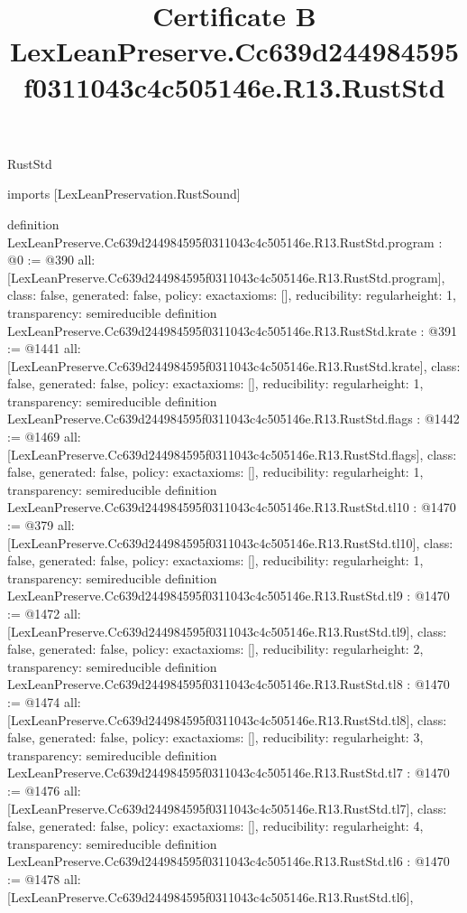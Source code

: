 \begin{lexlean}{RustStd}
\title{Certificate B LexLeanPreserve.Cc639d244984595f0311043c4c505146e.R13.RustStd}
\begin{coremodule}
imports [LexLeanPreservation.RustSound]

definition LexLeanPreserve.Cc639d244984595f0311043c4c505146e.R13.RustStd.program : @0 := @390 {
  all: [LexLeanPreserve.Cc639d244984595f0311043c4c505146e.R13.RustStd.program],
  class: false,
  generated: false,
  policy: exact{axioms: []},
  reducibility: regular{height: 1},
  transparency: semireducible
}
definition LexLeanPreserve.Cc639d244984595f0311043c4c505146e.R13.RustStd.krate : @391 := @1441 {
  all: [LexLeanPreserve.Cc639d244984595f0311043c4c505146e.R13.RustStd.krate],
  class: false,
  generated: false,
  policy: exact{axioms: []},
  reducibility: regular{height: 1},
  transparency: semireducible
}
definition LexLeanPreserve.Cc639d244984595f0311043c4c505146e.R13.RustStd.flags : @1442 := @1469 {
  all: [LexLeanPreserve.Cc639d244984595f0311043c4c505146e.R13.RustStd.flags],
  class: false,
  generated: false,
  policy: exact{axioms: []},
  reducibility: regular{height: 1},
  transparency: semireducible
}
definition LexLeanPreserve.Cc639d244984595f0311043c4c505146e.R13.RustStd.tl10 : @1470 := @379 {
  all: [LexLeanPreserve.Cc639d244984595f0311043c4c505146e.R13.RustStd.tl10],
  class: false,
  generated: false,
  policy: exact{axioms: []},
  reducibility: regular{height: 1},
  transparency: semireducible
}
definition LexLeanPreserve.Cc639d244984595f0311043c4c505146e.R13.RustStd.tl9 : @1470 := @1472 {
  all: [LexLeanPreserve.Cc639d244984595f0311043c4c505146e.R13.RustStd.tl9],
  class: false,
  generated: false,
  policy: exact{axioms: []},
  reducibility: regular{height: 2},
  transparency: semireducible
}
definition LexLeanPreserve.Cc639d244984595f0311043c4c505146e.R13.RustStd.tl8 : @1470 := @1474 {
  all: [LexLeanPreserve.Cc639d244984595f0311043c4c505146e.R13.RustStd.tl8],
  class: false,
  generated: false,
  policy: exact{axioms: []},
  reducibility: regular{height: 3},
  transparency: semireducible
}
definition LexLeanPreserve.Cc639d244984595f0311043c4c505146e.R13.RustStd.tl7 : @1470 := @1476 {
  all: [LexLeanPreserve.Cc639d244984595f0311043c4c505146e.R13.RustStd.tl7],
  class: false,
  generated: false,
  policy: exact{axioms: []},
  reducibility: regular{height: 4},
  transparency: semireducible
}
definition LexLeanPreserve.Cc639d244984595f0311043c4c505146e.R13.RustStd.tl6 : @1470 := @1478 {
  all: [LexLeanPreserve.Cc639d244984595f0311043c4c505146e.R13.RustStd.tl6],
}
\end{coremodule}
\end{lexlean}

